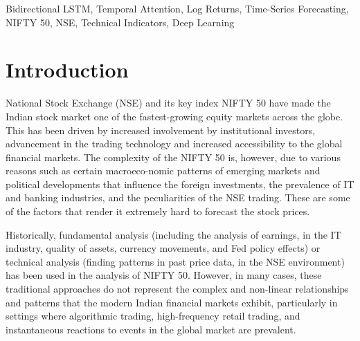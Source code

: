 \documentclass[conference]{IEEEtran}
\begin{document}
\maketitle

\begin{abstract}
In new equity markets, short term predictions cannot be made accurately due to changing patterns, changes in market conditions and noisy price changes. The current paper presents a full deep learning model to predict the daily logarithmic returns of NIFTY 50 stocks with a bidirectional LSTM model with a temporal attention mechanism. The model takes daily OHLCV data, incorporates common technical indicators and scales them with parameters exclusively on the training data. These data are converted into fixed length sequences by looking up 60 trading days. The model forecasts the daily log return and then uses exponential reconstruction to transform this into a price forecast. Various measurements such as RMSE are used to check the performance, MAE, MAPE, R2 and directional accuracy. The validation process is performed in a manner that prevents data leakage and enables repeatable and reproducible results.
\end{abstract}

\begin{IEEEkeywords}
Bidirectional LSTM, Temporal Attention, Log Returns, Time-Series Forecasting, NIFTY 50, NSE, Technical Indicators, Deep Learning
\end{IEEEkeywords}

\section{Introduction}

National Stock Exchange (NSE) and its key index NIFTY 50 have made the Indian stock market one of the fastest-growing equity markets across the globe. This has been driven by increased involvement by institutional investors, advancement in the trading technology and increased accessibility to the global financial markets. The complexity of the NIFTY 50 is, however, due to various reasons such as certain macroeco-nomic patterns of emerging markets and political developments that influence the foreign investments, the prevalence of IT and banking industries, and the peculiarities of the NSE trading. These are some of the factors that render it extremely hard to forecast the stock prices.

Historically, fundamental analysis (including the analysis of earnings, in the IT industry, quality of assets, currency movements, and Fed policy effects) or technical analysis (finding patterns in past price data, in the NSE environment) has been used in the analysis of NIFTY 50. However, in many cases, these traditional approaches do not represent the complex and non-linear relationships and patterns that the modern Indian financial markets exhibit, particularly in settings where algorithmic trading, high-frequency retail trading, and instantaneous reactions to events in the global market are prevalent.
\end{document}
